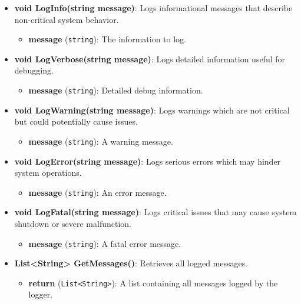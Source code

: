 \documentclass[12pt]{article}
\begin{document}
\begin{itemize}
    \item \textbf{void LogInfo(string message)}: Logs informational messages that describe non-critical system behavior.
        \begin{itemize}
            \item \textbf{message} (\texttt{string}): The information to log.
        \end{itemize}

    \item \textbf{void LogVerbose(string message)}: Logs detailed information useful for debugging.
        \begin{itemize}
            \item \textbf{message} (\texttt{string}): Detailed debug information.
        \end{itemize}

    \item \textbf{void LogWarning(string message)}: Logs warnings which are not critical but could potentially cause issues.
        \begin{itemize}
            \item \textbf{message} (\texttt{string}): A warning message.
        \end{itemize}

    \item \textbf{void LogError(string message)}: Logs serious errors which may hinder system operations.
        \begin{itemize}
            \item \textbf{message} (\texttt{string}): An error message.
        \end{itemize}

    \item \textbf{void LogFatal(string message)}: Logs critical issues that may cause system shutdown or severe malfunction.
        \begin{itemize}
            \item \textbf{message} (\texttt{string}): A fatal error message.
        \end{itemize}

    \item \textbf{List<String> GetMessages()}: Retrieves all logged messages.
        \begin{itemize}
            \item \textbf{return} (\texttt{List<String>}): A list containing all messages logged by the logger.
        \end{itemize}
\end{itemize}
\end{document}
